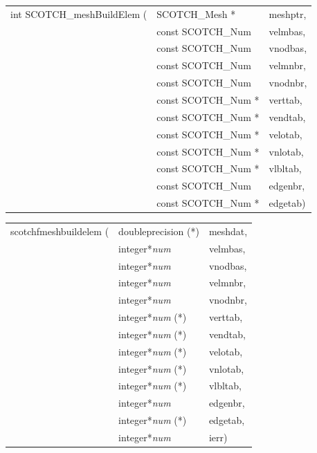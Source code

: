 \begin{itemize}
\progsyn

{\tt\begin{tabular}{l@{}ll}
int SCOTCH\_meshBuildElem ( & SCOTCH\_Mesh *      & meshptr, \\
                            & const SCOTCH\_Num   & velmbas, \\
                            & const SCOTCH\_Num   & vnodbas, \\
                            & const SCOTCH\_Num   & velmnbr, \\
                            & const SCOTCH\_Num   & vnodnbr, \\
                            & const SCOTCH\_Num * & verttab, \\
                            & const SCOTCH\_Num * & vendtab, \\
                            & const SCOTCH\_Num * & velotab, \\
                            & const SCOTCH\_Num * & vnlotab, \\
                            & const SCOTCH\_Num * & vlbltab, \\
                            & const SCOTCH\_Num   & edgenbr, \\
                            & const SCOTCH\_Num * & edgetab)
\end{tabular}}

{\tt\begin{tabular}{l@{}ll}
scotchfmeshbuildelem ( & doubleprecision (*)   & meshdat, \\
                       & integer*{\it num}     & velmbas, \\
                       & integer*{\it num}     & vnodbas, \\
                       & integer*{\it num}     & velmnbr, \\
                       & integer*{\it num}     & vnodnbr, \\
                       & integer*{\it num} (*) & verttab, \\
                       & integer*{\it num} (*) & vendtab, \\
                       & integer*{\it num} (*) & velotab, \\
                       & integer*{\it num} (*) & vnlotab, \\
                       & integer*{\it num} (*) & vlbltab, \\
                       & integer*{\it num}     & edgenbr, \\
                       & integer*{\it num} (*) & edgetab, \\
                       & integer*{\it num}     & ierr)
\end{tabular}}


\end{itemize}
